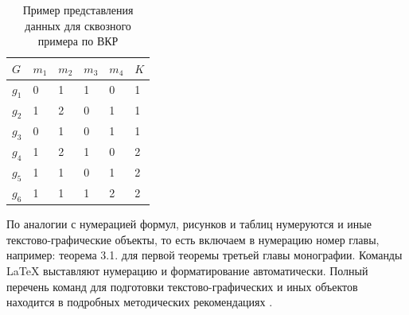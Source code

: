 	


%



\begin{table} [htbp]%
	\centering\small
	\caption{Пример представления данных для сквозного примера по ВКР \cite{Peskov2004}}%
	\label{tab:ToyCompare}		
		\begin{tabular}{|l|l|l|l|l|l|}
			\hline
			$G$&$m_1$&$m_2$&$m_3$&$m_4$&$K$\\
			\hline
			$g_1$&0&1&1&0&1\\ \hline
			$g_2$&1&2&0&1&1\\ \hline
			$g_3$&0&1&0&1&1\\ \hline
			$g_4$&1&2&1&0&2\\ \hline
			$g_5$&1&1&0&1&2\\ \hline
			$g_6$&1&1&1&2&2\\ \hline		
		\end{tabular}
	\normalsize%
\end{table}









 

По аналогии с нумерацией формул, рисунков и таблиц нумеруются и иные текстово-графические объекты, то есть включаем в нумерацию номер главы, например: теорема 3.1. для первой теоремы третьей главы монографии. Команды \LaTeX{} выставляют нумерацию и форматирование автоматически. Полный перечень команд для подготовки текстово-графических и иных объектов находится в подробных методических рекомендациях \cite{spbpu-bci-template-author-guide}. 



